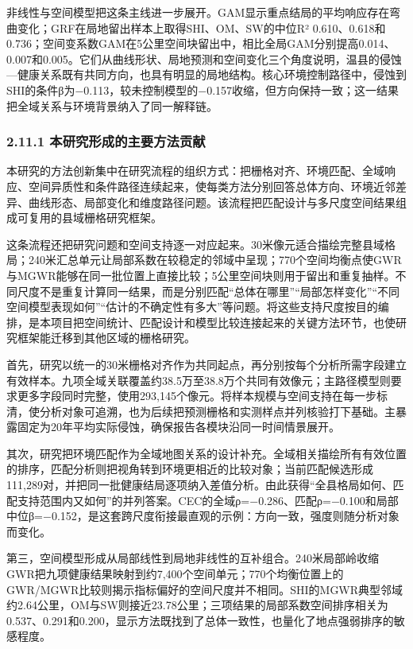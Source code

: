 \documentclass[
  11pt,
  a4paper,
]{ctexart}
\begin{document}
非线性与空间模型把这条主线进一步展开。GAM显示重点结局的平均响应存在弯曲变化；GRF在局地留出样本上取得SHI、OM、SW的中位R²
0.610、0.618和0.736；空间变系数GAM在5公里空间块留出中，相比全局GAM分别提高0.014、0.007和0.005。它们从曲线形状、局地预测和空间变化三个角度说明，温县的侵蚀---健康关系既有共同方向，也具有明显的局地结构。核心环境控制路径中，侵蚀到SHI的条件β为−0.113，较未控制模型的−0.157收缩，但方向保持一致；这一结果把全域关系与环境背景纳入了同一解释链。

\hypertarget{ux672cux7814ux7a76ux5f62ux6210ux7684ux4e3bux8981ux65b9ux6cd5ux8d21ux732e}{%
\subsubsection{2.11.1
本研究形成的主要方法贡献}\label{ux672cux7814ux7a76ux5f62ux6210ux7684ux4e3bux8981ux65b9ux6cd5ux8d21ux732e}}

本研究的方法创新集中在研究流程的组织方式：把栅格对齐、环境匹配、全域响应、空间异质性和条件路径连续起来，使每类方法分别回答总体方向、环境近邻差异、曲线形态、局部变化和维度路径问题。该流程把匹配设计与多尺度空间结果组成可复用的县域栅格研究框架。

这条流程还把研究问题和空间支持逐一对应起来。30米像元适合描绘完整县域格局；240米汇总单元让局部系数在较稳定的邻域中呈现；770个空间均衡点使GWR与MGWR能够在同一批位置上直接比较；5公里空间块则用于留出和重复抽样。不同尺度不是重复计算同一结果，而是分别匹配``总体在哪里''``局部怎样变化''``不同空间模型表现如何''``估计的不确定性有多大''等问题。将这些支持尺度按目的编排，是本项目把空间统计、匹配设计和模型比较连接起来的关键方法环节，也使研究框架能迁移到其他区域的栅格研究。

首先，研究以统一的30米栅格对齐作为共同起点，再分别按每个分析所需字段建立有效样本。九项全域关联覆盖约38.5万至38.8万个共同有效像元；主路径模型则要求更多字段同时完整，使用293,145个像元。将样本规模与空间支持在每一步标清，使分析对象可追溯，也为后续把预测栅格和实测样点并列核验打下基础。主暴露固定为20年平均实际侵蚀，确保报告各模块沿同一时间情景展开。

其次，研究把环境匹配作为全域地图关系的设计补充。全域相关描绘所有有效位置的排序，匹配分析则把视角转到环境更相近的比较对象；当前匹配候选形成111,289对，并把同一批健康结局逐项纳入差值分析。由此获得``全县格局如何、匹配支持范围内又如何''的并列答案。CEC的全域ρ=−0.286、匹配ρ=−0.100和局部中位β=−0.152，是这套跨尺度衔接最直观的示例：方向一致，强度则随分析对象而变化。

第三，空间模型形成从局部线性到局地非线性的互补组合。240米局部岭收缩GWR把九项健康结果映射到约7,400个空间单元；770个均衡位置上的GWR/MGWR比较则揭示指标偏好的空间尺度并不相同。SHI的MGWR典型邻域约2.64公里，OM与SW则接近23.78公里；三项结果的局部系数空间排序相关为0.537、0.291和0.200，显示方法既找到了总体一致性，也量化了地点强弱排序的敏感程度。
\end{document}
